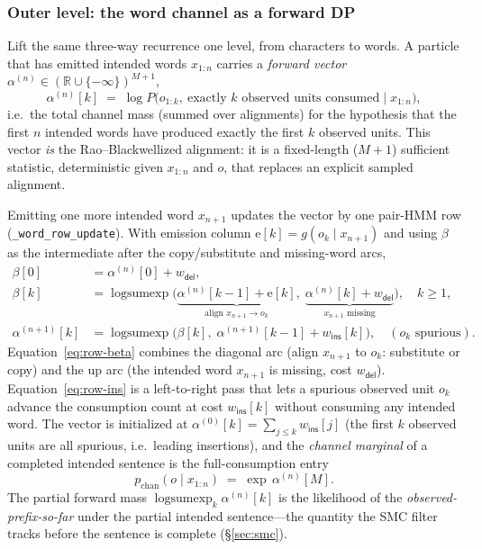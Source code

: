 \documentclass[11pt]{article}
\providecommand{\Real}{\mathbb{R}}
\providecommand{\given}{\mid}
\providecommand{\insact}{\textsf{ins}}
\providecommand{\delact}{\textsf{del}}
\providecommand{\lse}{\operatorname{logsumexp}}
\providecommand{\code}[1]{\texttt{#1}}
\providecommand{\chan}{g}            %
\providecommand{\wdel}{w_{\delact}}
\providecommand{\wins}{w_{\insact}}
\begin{document}
\subsubsection{Outer level: the word channel as a forward DP}
\label{sec:word-channel}

Lift the same three-way recurrence one level, from characters to words. A particle that has emitted intended words $x_{1:n}$ carries a \emph{forward vector} $\alpha^{(n)} \in (\Real\cup\{-\infty\})^{M+1}$,
\begin{equation}\label{eq:alpha-def}
  \alpha^{(n)}[k] \;=\; \log P\big(o_{1:k},\ \text{exactly } k \text{ observed units consumed}
                                   \;\big|\; x_{1:n}\big),
\end{equation}
i.e.\ the total channel mass (summed over alignments) for the hypothesis that the first $n$ intended words have produced exactly the first $k$ observed units. This vector \emph{is} the Rao--Blackwellized alignment: it is a fixed-length ($M{+}1$) sufficient statistic, deterministic given $x_{1:n}$ and $o$, that replaces an explicit sampled alignment.

Emitting one more intended word $x_{n+1}$ updates the vector by one pair-HMM row (\code{\_word\_row\_update}). With emission column $\mathrm{e}[k] = \chan(o_{k}\given x_{n+1})$ and using $\beta$ as the intermediate after the copy/substitute and missing-word arcs,
\begin{align}
  \beta[0]   &= \alpha^{(n)}[0] + \wdel, \label{eq:row-beta0}\\
  \beta[k]   &= \lse\big(\underbrace{\alpha^{(n)}[k{-}1] + \mathrm{e}[k]}_{\text{align } x_{n+1}\to o_k},\;
                          \underbrace{\alpha^{(n)}[k] + \wdel}_{x_{n+1}\text{ missing}}\big),
                          \quad k\ge 1, \label{eq:row-beta}\\
  \alpha^{(n+1)}[k] &= \lse\big(\beta[k],\;\alpha^{(n+1)}[k{-}1] + \wins[k]\big),
                          \quad (\text{$o_k$ spurious}) . \label{eq:row-ins}
\end{align}
Equation~\eqref{eq:row-beta} combines the diagonal arc (align $x_{n+1}$ to $o_k$: substitute or copy) and the up arc (the intended word $x_{n+1}$ is missing, cost $\wdel$). Equation~\eqref{eq:row-ins} is a left-to-right pass that lets a spurious observed unit $o_k$ advance the consumption count at cost $\wins[k]$ without consuming any intended word. The vector is initialized at $\alpha^{(0)}[k] = \sum_{j\le k} \wins[j]$ (the first $k$ observed units are all spurious, i.e.\ leading insertions), and the \emph{channel marginal} of a completed intended sentence is the full-consumption entry
\begin{equation}\label{eq:chan-from-alpha}
  p_{\mathrm{chan}}(o \given x_{1:n}) \;=\; \exp\,\alpha^{(n)}[M].
\end{equation}
The partial forward mass $\lse_k \alpha^{(n)}[k]$ is the likelihood of the \emph{observed-prefix-so-far} under the partial intended sentence---the quantity the SMC filter tracks before the sentence is complete (\S\ref{sec:smc}).
\end{document}
